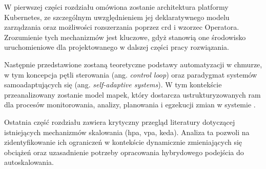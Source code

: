 W pierwszej części rozdziału omówiona zostanie architektura platformy Kubernetes, ze szczególnym 
uwzględnieniem jej deklaratywnego modelu zarządzania oraz możliwości rozszerzania poprzez \gls{crd} 
i wzorzec Operatora. Zrozumienie tych mechanizmów jest kluczowe, gdyż stanowią one środowisko 
uruchomieniowe dla projektowanego w dalszej części pracy rozwiązania.

Następnie przedstawione zostaną teoretyczne podstawy automatyzacji w chmurze, w tym koncepcja 
pętli sterowania (ang. \textit{control loop}) oraz paradygmat systemów samoadaptujących się 
(ang. \textit{self-adaptive systems}). W tym kontekście przeanalizowany zostanie model \gls{mapek}, 
który dostarcza ustrukturyzowanych ram dla procesów monitorowania, analizy, planowania i egzekucji 
zmian w systemie \cite{kephart2003vision}.

Ostatnia część rozdziału zawiera krytyczny przegląd literatury dotyczącej istniejących mechanizmów 
skalowania (\gls{hpa}, \gls{vpa}, \gls{keda}). Analiza ta pozwoli na zidentyfikowanie ich ograniczeń 
w kontekście dynamicznie zmieniających się obciążeń oraz uzasadnienie potrzeby opracowania hybrydowego 
podejścia do autoskalowania.














